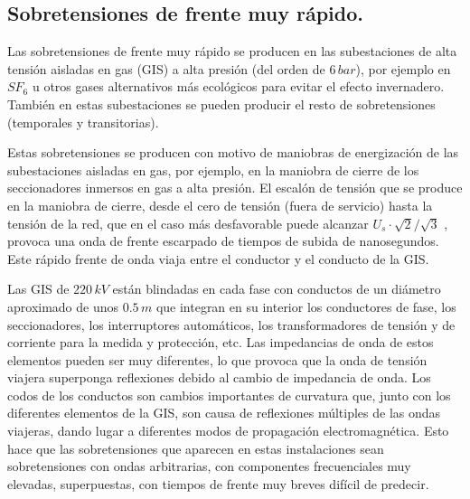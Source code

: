         \subsection{Sobretensiones de frente muy rápido.}
            Las sobretensiones de frente muy rápido se producen en las subestaciones de alta tensión aisladas en gas (GIS) a alta presión (del orden de $6\,\textit{bar}$), por ejemplo en $\textit{SF}_6$ u otros gases alternativos más ecológicos para evitar el efecto invernadero. También en estas subestaciones se pueden producir el resto de sobretensiones (temporales y transitorias).\newline

            Estas sobretensiones se producen con motivo de maniobras de energización de las subestaciones aisladas en gas, por ejemplo, en la maniobra de cierre de los seccionadores inmersos en gas a alta presión. El escalón de tensión que se produce en la maniobra de cierre, desde el cero de tensión (fuera de servicio) hasta la tensión de la red, que en el caso más desfavorable puede alcanzar $U_\textit{s}\cdot \sqrt{2}/\sqrt{3}$ , provoca una onda de frente escarpado de tiempos de subida de nanosegundos. Este rápido frente de onda viaja entre el conductor y el conducto de la GIS.\newline

            Las GIS de $220\,\textit{kV}$ están blindadas en cada fase con conductos de un diámetro aproximado de unos $0.5\,\textit{m}$ que integran en su interior los conductores de fase, los seccionadores, los interruptores automáticos, los transformadores de tensión y de corriente para la medida y protección, etc. Las impedancias de onda de estos elementos pueden ser muy diferentes, lo que provoca que la onda de tensión viajera superponga reflexiones debido al cambio de impedancia de onda. Los codos de los conductos son cambios importantes de curvatura que, junto con los diferentes elementos de la GIS, son causa de reflexiones múltiples de las ondas viajeras, dando lugar a diferentes modos de propagación electromagnética. Esto hace que las sobretensiones que aparecen en estas instalaciones sean sobretensiones con ondas arbitrarias, con componentes frecuenciales muy elevadas, superpuestas, con tiempos de frente muy breves difícil de predecir.

